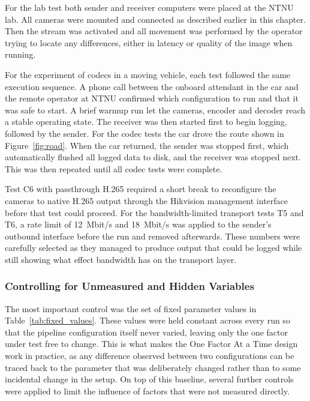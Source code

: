 For the lab test both sender and receiver computers were placed at the NTNU lab. All cameras
were mounted and connected as described earlier in this chapter. Then the stream was activated and all movement was performed by the operator trying to locate any differences, either in latency or quality of the image when running.

For the experiment of codecs in a moving vehicle, each test followed the same execution sequence. A phone call between the onboard attendant in the car and the remote operator at NTNU confirmed which configuration to run and that it was safe to start. A brief warmup run let the cameras, encoder and decoder reach a stable operating state. The receiver was then started first to begin logging, followed by the sender. For the codec tests the car drove the route shown in Figure~\ref{fig:road}. When the car returned, the sender was stopped first, which automatically flushed all logged data to disk, and the receiver was stopped next. This was then repeated until all codec tests were complete.

Test C6 with passthrough H.265 required a short break to reconfigure the cameras to native H.265 output through the Hikvision management interface before that test could proceed. For the bandwidth-limited transport tests T5 and T6, a rate limit of 12~Mbit/s and 18~Mbit/s was applied to the sender's outbound interface before the run and removed afterwards. These numbers were carefully selected as they managed to produce output that could be logged while still showing what effect bandwidth has on the transport layer.

\subsubsection{Controlling for Unmeasured and Hidden Variables}\label{subsubsec:controllingUmeasruedVariables}

The most important control was the set of fixed parameter values in Table~\ref{tab:fixed_values}. These values were held constant across every run so that the pipeline configuration itself never varied, leaving only the one factor under test free to change. This is what makes the One Factor At a Time design work in practice, as any difference observed between two configurations can be traced back to the parameter that was deliberately changed rather than to some incidental change in the setup. On top of this baseline, several further controls were applied to limit the influence of factors that were not measured directly.

